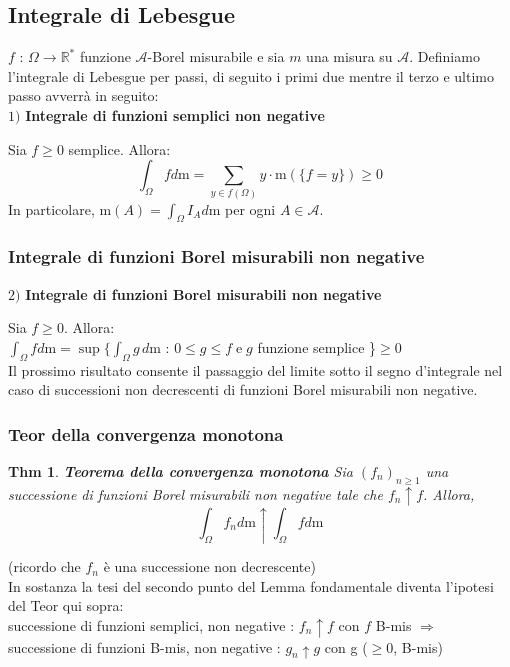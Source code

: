 \documentclass[a4paper,11pt]{article}
\theoremstyle{plain}
\newtheorem{thm}{Thm}[section]
\theoremstyle{definition}
\theoremstyle{remark}
\begin{document}
\subsection{Integrale di Lebesgue}
$f$ : $\Omega\rightarrow \mathbb{R}^{*}$ funzione $\mathcal{A}$-Borel misurabile e sia $m$ una misura su $\mathcal{A}$. Definiamo l'integrale di Lebesgue per passi, di seguito i primi due mentre il terzo e ultimo passo avverrà in seguito:\\

\noindent
$1)$ \textbf{Integrale di funzioni semplici non negative}

Sia $f\geq 0$ semplice. Allora:
$$
\int_{\Omega}fd\mathrm{m}=\sum_{y\in f(\Omega)}y \cdot \mathrm{m}(\{f=y\})\geq 0
$$
In particolare, $\displaystyle \mathrm{m}(A)=\int_{\Omega}I_{A}d\mathrm{m}$ per ogni $A\in \mathcal{A}.$

\subsubsection{Integrale di  funzioni Borel misurabili non negative}
\noindent
$2)$ \textbf{Integrale di  funzioni Borel misurabili non negative}

Sia $f\geq 0$. Allora:\\

$\displaystyle \int_{\Omega}fd\mathrm{m}=\sup\{\int_{\Omega}g\, d\mathrm{m}$ : $0\leq g\leq f\; \mathrm{e}\;g$ funzione semplice \}$\geq 0$\\

\noindent
Il prossimo risultato consente il passaggio del limite sotto il segno d'integrale nel caso di successioni non decrescenti di funzioni Borel misurabili non negative.
\subsubsection{Teor della convergenza monotona}
\begin{thm} \textbf{Teorema della convergenza monotona}
Sia $(f_{n})_{n\geq 1}$ una successione di funzioni Borel misurabili non negative tale che $f_{n}\uparrow f$. Allora,
$$
\int_{\Omega}f_{n}d\mathrm{m}\uparrow\int_{\Omega}fd\mathrm{m}
$$
\end{thm}
\noindent
(ricordo che  $f_n$ è una successione non decrescente)\\

\noindent
In sostanza la tesi del secondo punto del Lemma fondamentale diventa l'ipotesi del Teor qui sopra:\\ successione di funzioni semplici, non negative : $f_n \uparrow f$ con $f$ B-mis $\Rightarrow$ \\ successione di funzioni B-mis, non negative : $g_n \uparrow g$ con g ($\geq 0$, B-mis) \\
\end{document}
